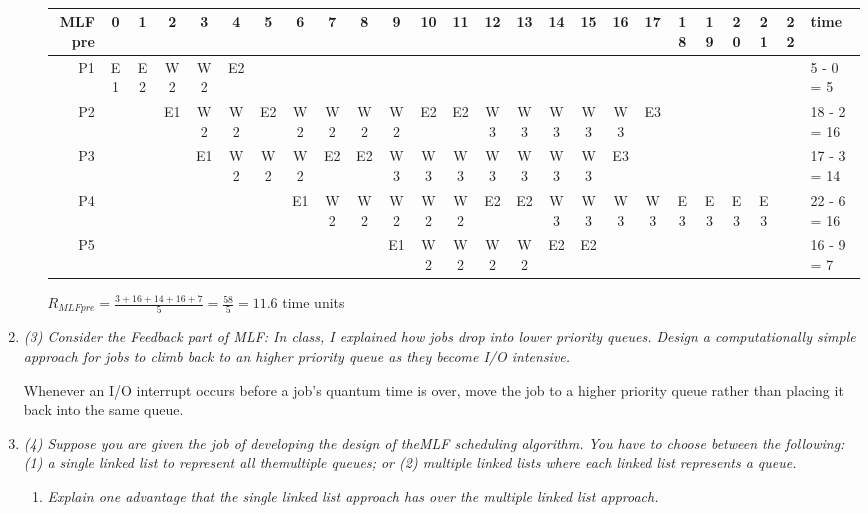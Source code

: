 \documentclass[letterpaper,11pt]{article}
\begin{document}
\begin{enumerate}
\begin{enumerate}
\begin{center}\footnotesize
\tiny\tt
  \begin{tabular}{ r || c | c | c | c | c | c | c | c | c | c | c | c | c | c | c | c | c | c | c | c | c | c | c || l }
    \hline
    MLF pre  & 0 & 1 & 2 & 3 & 4 & 5 & 6 & 7 & 8 & 9 & 10 & 11 & 12 & 13 & 14 & 15 & 16 & 17 & 18 & 19 & 20 & 21 & 22 & time \\ \hline
    \hline
    P1   & E1 & E2 & W2 & W2 & E2 &   &   &   &   &   &    &    &    &    &    &    &    &    &    &    &    &    &    & 5 - 0 = 5 \\ \hline
    P2   &    &   & E1 & W2 & W2 & E2 & W2 & W2 & W2 & W2 & E2 & E2 & W3 & W3 & W3 & W3 & W3 & E3 &    &    &    &    &    & 18 - 2 = 16 \\ \hline
    P3   &    &   &   & E1 & W2 & W2 & W2 & E2 & E2 & W3 & W3 & W3 & W3 & W3 & W3 & W3 & E3 &   &    &    &    &    &    & 17 - 3 = 14 \\ \hline
    P4   &    &   &   &   &   &   & E1 & W2 & W2 & W2 & W2 & W2 & E2 & E2  & W3  & W3  & W3  & W3  & E3  & E3  & E3  & E3  &    & 22 - 6 = 16 \\ \hline
    P5   &    &   &   &   &   &   &   &   &   & E1 & W2  & W2  & W2  & W2  & E2  & E2 &    &    &    &    &    &    &    & 16 - 9 = 7 \\ \hline
    \hline
  \end{tabular}
\end{center}
$R_{MLFpre} = \frac{3 + 16 + 14 + 16 + 7}{5} = \frac{58}{5} = 11.6$ time units
\end{enumerate}
\item \emph{(3) Consider the Feedback part of MLF: In class, I explained how jobs drop into lower priority queues. Design a computationally simple approach for jobs to climb back to an
higher priority queue as they become I/O intensive.}

Whenever an I/O interrupt occurs before a job's quantum time is over, move the job to a higher priority queue rather than placing it back into the same queue.
\item \emph{(4) Suppose you are given the job of developing the design of theMLF scheduling algorithm. You have to choose between the following: (1) a single linked list to represent all themultiple queues; or (2) multiple linked lists where each linked list represents a queue.}

\begin{enumerate}
\item \emph{Explain one advantage that the single linked list approach has over the multiple linked list approach.}


\end{enumerate}
\end{enumerate}
\end{document}
